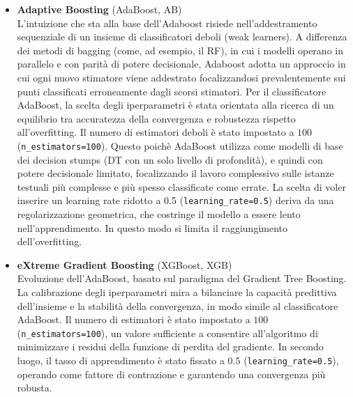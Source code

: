 \documentclass[12pt, a4paper, twoside]{article}
\numberwithin{table}{section}
\begin{document}
\begin{itemize}
        \item \textbf{Adaptive Boosting} (AdaBoost, AB) \\
        L'intuizione che sta alla base dell'Adaboost risiede nell'addestramento sequenziale di un insieme di classificatori 
        deboli (weak learners). A differenza dei metodi di bagging (come, ad esempio, il RF), in cui i modelli operano in 
        parallelo e con parità di potere decisionale, Adaboost adotta un approccio in cui ogni nuovo stimatore viene addestrato
        focalizzandosi prevalentemente sui punti classificati erroneamente dagli scorsi stimatori.        
        Per il classificatore AdaBoost, la scelta degli iperparametri è stata orientata alla ricerca di un equilibrio tra
        accuratezza della convergenza e robustezza rispetto all'overfitting. Il numero di estimatori deboli è stato impostato 
        a $100$ (\texttt{n\_estimators=100}). Questo poichè AdaBoost utilizza come modelli di base dei decision stumps 
        (DT con un solo livello di profondità), e quindi con potere decisionale limitato, focalizzando il lavoro complessivo
        sulle istanze testuali più complesse e più spesso classificate come errate. La scelta di voler inserire un learning
        rate ridotto a 0.5 (\texttt{learning\_rate=0.5}) deriva da una regolarizzazione geometrica, che costringe il modello 
        a essere lento nell'apprendimento. In questo modo si limita il raggiungimento dell'overfitting.


        \item \textbf{eXtreme Gradient Boosting} (XGBoost, XGB) \\
        Evoluzione dell'AdaBoost, basato sul paradigma del Gradient Tree Boosting. La calibrazione degli iperparametri
        mira a bilanciare la capacità predittiva dell'insieme e la stabilità della convergenza, in modo simile al classificatore
        AdaBoost. Il numero di estimatori è stato impostato a $100$ (\texttt{n\_estimators=100}), un valore sufficiente a 
        consentire all'algoritmo di minimizzare i residui della funzione di perdita del gradiente. In secondo luogo, il tasso
        di apprendimento è stato fissato a $0.5$ (\texttt{learning\_rate=0.5}), operando come fattore di contrazione e garantendo
        una convergenza più robusta.
        
    \end{itemize}
    
    \clearpage
    \thispagestyle{plain}
\end{document}
